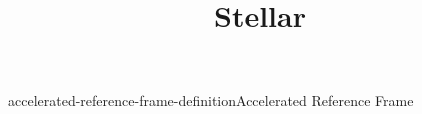 \documentclass[preview]{standalone}
\begin{document}
\title{Stellar}
\genpage

\begin{snippetdefinition}{accelerated-reference-frame-definition}{Accelerated Reference Frame}
    
\end{snippetdefinition}
    
\end{document}
